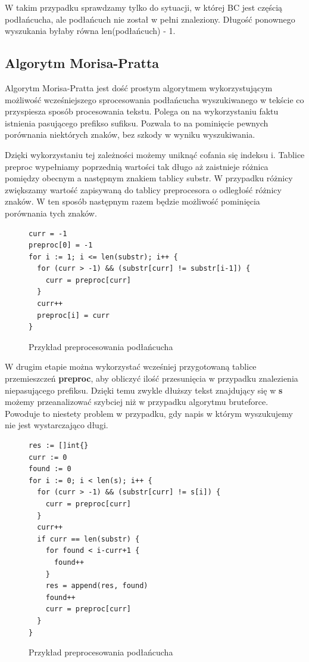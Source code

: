 W takim przypadku sprawdzamy tylko do sytuacji, w której BC jest częścią
podłańcucha, ale podłańcuch nie został w pełni znaleziony. Długość ponownego 
wyszukania byłaby równa len(podłańcuch) - 1.

\subsection{Algorytm Morisa-Pratta}

Algorytm Morisa-Pratta jest dość prostym algorytmem wykorzystującym możliwość
wcześniejszego sprocesowania podłańcucha wyszukiwanego w tekście co przyspiesza
sposób procesowania tekstu. Polega on na wykorzystaniu faktu istnienia pasującego
prefikso sufiksu. Pozwala to na pominięcie pewnych porównania niektórych znaków,
bez szkody w wyniku wyszukiwania.

Dzięki wykorzystaniu tej zależności możemy uniknąć cofania się indeksu i. 
Tablice preproc wypełniamy poprzednią wartości tak długo aż zaistnieje różnica 
pomiędzy obecnym a następnym znakiem tablicy substr. W przypadku różnicy 
zwiększamy wartość zapisywaną do tablicy preprocesora o odległość różnicy znaków.
W ten sposób następnym razem będzie możliwość pominięcia porównania tych znaków.

\begin{figure}[h]
  \centering
  \begin{lstlisting}
curr = -1
preproc[0] = -1
for i := 1; i <= len(substr); i++ {
  for (curr > -1) && (substr[curr] != substr[i-1]) {
    curr = preproc[curr]
  }
  curr++
  preproc[i] = curr
}
  \end{lstlisting}
  \caption{Przykład preprocesowania podłańcucha }
  \label{fig:code:preprocessMorisPratt}
\end{figure}

W drugim etapie można wykorzystać wcześniej przygotowaną tablice przemieszczeń 
\textbf{preproc}, aby obliczyć ilość przesunięcia w przypadku znalezienia 
niepasującego prefiksu. Dzięki temu zwykle dłuższy tekst znajdujący się w 
\textbf{s} możemy przeanalizować szybciej niż w przypadku algorytmu bruteforce.
Powoduje to niestety problem w przypadku, gdy napis w którym wyszukujemy nie 
jest wystarczająco długi.

\begin{figure}[h]
  \centering
  \begin{lstlisting}
res := []int{}
curr := 0
found := 0
for i := 0; i < len(s); i++ {
  for (curr > -1) && (substr[curr] != s[i]) {
    curr = preproc[curr]
  }
  curr++
  if curr == len(substr) {
    for found < i-curr+1 {
      found++
    }
    res = append(res, found)
    found++
    curr = preproc[curr]
  }
}
  \end{lstlisting}
  \caption{Przykład preprocesowania podłańcucha }
  \label{fig:code:preprocessMorisPratt}
\end{figure}

